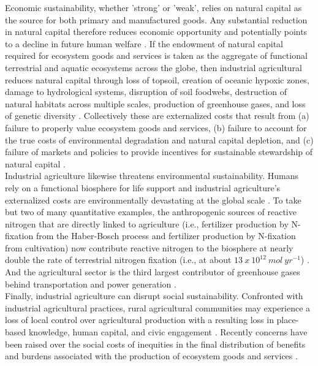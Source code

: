 \documentclass[twoside]{article}	%
\begin{document}
Economic sustainability, whether 'strong' or 'weak', relies on natural capital as the source for both primary and manufactured goods. Any substantial reduction in natural capital therefore reduces economic opportunity and potentially points to a decline in future human welfare \citep{pearce_blueprint_2000}. If the endowment of natural capital required for ecosystem goods and services is taken as the aggregate of functional terrestrial and aquatic ecosystems across the globe, then industrial agricultural reduces natural capital through loss of topsoil, creation of oceanic hypoxic zones, damage to hydrological systems, disruption of soil foodwebs, destruction of natural habitats across multiple scales, production of greenhouse gases, and loss of genetic diversity \citep{gliessman_agroecology:_2015}. Collectively these are externalized costs that result from (a) failure to properly value ecosystem goods and services, (b) failure to account for the true costs of environmental degradation and natural capital depletion, and (c) failure of markets and policies to provide incentives for sustainable stewardship of natural capital \citep{pearce_blueprint_2000}. \\

Industrial agriculture likewise threatens environmental sustainability. Humans rely on a functional biosphere for life support and industrial agriculture's externalized costs are environmentally devastating at the global scale \citep{tilman_agricultural_2002, wolfe_crop_2000, ceballos_accelerated_2015}. To take but two of many quantitative examples, the anthropogenic sources of reactive nitrogen that are directly linked to agriculture (i.e., fertilizer production by N-fixation from the Haber-Bosch process and fertilizer production by N-fixation from cultivation) now contribute reactive nitrogen to the biosphere at nearly double the rate of terrestrial nitrogen fixation (i.e., at about $13 \ x \ 10^{12} \ mol \ yr^{-1}$) \citep{canfield_evolution_2010}. And the agricultural sector is the third largest contributor of greenhouse gases behind transportation and power generation \citep{gliessman_agroecology:_2015}. \\

Finally, industrial agriculture can disrupt social sustainability. Confronted with industrial agricultural practices, rural agricultural communities may experience a loss of local control over agricultural production with a resulting loss in place-based knowledge, human capital, and civic engagement \citep{beus_conventional_1990, oecd_well-being_2001}. Recently concerns have been raised over the social costs of inequities in the final distribution of benefits and burdens associated with the production of ecosystem goods and services \citep{berbes-blazquez_towards_2016}.\\
\end{document}
